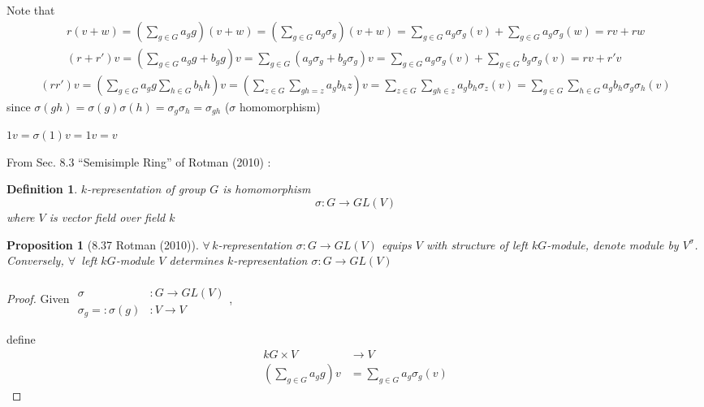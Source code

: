 \documentclass[10pt]{amsart}
\newtheorem{proposition}{Proposition}
\newtheorem{definition}{Definition}
\begin{document}
\begin{multicols*}{2}
Note that 
\[
\begin{gathered}
r(v+w) = \left( \sum_{g\in G} a_g g \right)(v+w) = \left( \sum_{g \in G} a_g \sigma_g \right)(v+w) = \sum_{g\in G} a_g \sigma_g(v) + \sum_{g\in G} a_g \sigma_g(w) = rv + rw \\ 
(r+r')v = \left( \sum_{g\in G} a_g g + b_g g \right) v =\sum_{g\in G} (a_g \sigma_g + b_g \sigma_g ) v = \sum_{g \in G}a_g \sigma_g(v) + \sum_{g\in G}b_g \sigma_g(v) = rv + r'v 
\end{gathered}
\]
\[
\begin{gathered}
(rr')v = \left( \sum_{g\in G} a_g g \sum_{h \in G} b_h h \right)v = \left( \sum_{z\in G} \sum_{gh = z} a_g b_h z \right) v = \sum_{z\in G} \sum_{gh \in z} a_g b_h \sigma_z(v) = \sum_{g\in G} \sum_{h \in G} a_g b_h \sigma_g \sigma_h (v)
\end{gathered}
\]
since $\sigma(gh) = \sigma(g) \sigma(h) = \sigma_g \sigma_h = \sigma_{gh}$ ($\sigma$ homomorphism)

$1v = \sigma(1) v = 1v = v$



From Sec. 8.3 ``Semisimple Ring'' of Rotman (2010) \cite{JRotman2010}:

\begin{definition}
	$k$-representation of group $G$ is homomorphism
	\[
	\sigma : G \to GL(V)
	\]
	where $V$ is vector field over field $k$
\end{definition}

\begin{proposition}[8.37 Rotman (2010)\cite{JRotman2010}]\label{Prop:Rotman8.37}
	$\forall \, k$-representation $\sigma : G \to GL(V)$ equips $V$ with structure of left $kG$-module, denote module by $V^{\sigma}$.  \\
	Conversely, $\forall \, $ left $kG$-module $V$ determines $k$-representation $\sigma:G \to GL(V)$
\end{proposition}

\begin{proof}
	Given $\begin{aligned} & \quad \\
	\sigma & :G \to GL(V) \\
	\sigma_g =: \sigma(g) & : V \to V \end{aligned}$, 
	
	define 
	\[
	\begin{aligned}
	kG \times V & \to V \\ 
	\left( \sum_{g\in G} a_g g \right) v & = \sum_{g\in G} a_g \sigma_g(v) 
	\end{aligned}
	\]
	

\end{proof}
\end{multicols*}
\end{document}
